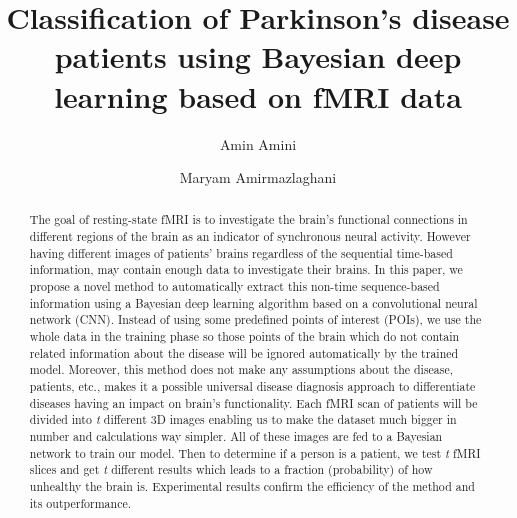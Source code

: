 \documentclass[preprint,12pt]{elsarticle}
\begin{document}
\let\WriteBookmarks\relax
\def\floatpagepagefraction{1}
\def\textpagefraction{.001}


\title{Classification of Parkinson's disease patients using Bayesian deep learning based on fMRI data}



\author[1]{Amin Amini}


\author[1]{Maryam Amirmazlaghani}


\address[1]{Department of Computer Engineering and Information Technology, Amirkabir University of Technology, Tehran, Iran}



\begin{abstract}
The goal of resting-state fMRI is to investigate the brain's functional connections in different regions of the brain as an indicator of synchronous neural activity.
However having different images of patients' brains regardless of the sequential time-based information, may contain enough data to investigate their brains.
In this paper, we propose a novel method to automatically extract this non-time sequence-based information using a Bayesian deep learning algorithm based on a convolutional neural network (CNN).
Instead of using some predefined points of interest (POIs), we use the whole data in the training phase so those points of the brain which do not contain related information about the disease will be ignored automatically by the trained model.
Moreover, this method does not make any assumptions about the disease, patients, etc.,
makes it a possible universal disease diagnosis approach to differentiate diseases having an impact on brain's functionality.
Each fMRI scan of patients will be divided into {\it t} different 3D images enabling us to make the dataset much bigger in number and calculations way simpler.
All of these images are fed to a Bayesian network to train our model.
Then to determine if a person is a patient, we test {\it t} fMRI slices and get {\it t} different results which leads to a fraction (probability) of how unhealthy the brain is. Experimental results confirm the efficiency of the method and its outperformance.
\end{abstract}
\end{document}
